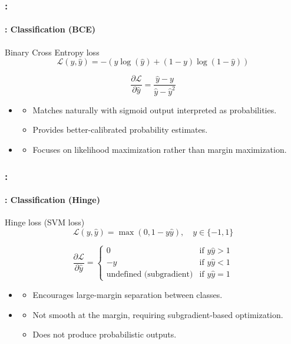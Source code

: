 \documentclass[xcolor=table]{beamer}
\begin{document}
\begin{frame}
	\frametitle{\insertshortsubtitle: \insertsection}
	\framesubtitle{\insertsubsection: Classification (BCE)}

	\begin{block}{Binary Cross Entropy loss}
		\[\mathcal{L}(y, \hat{y}) = - (y \log(\hat{y}) + (1 - y) \log(1 - \hat{y}))\]
		
		\[
		\frac{\partial \mathcal{L}}{\partial \hat{y}} = \frac{\hat{y} - y}{\hat{y} - \hat{y}^2}
		\]
	\end{block}
	
	\begin{itemize}
		\item {}
		\begin{itemize}
			\item Matches naturally with sigmoid output interpreted as probabilities.
			\item Provides better-calibrated probability estimates.
		\end{itemize}
		\item {}
		\begin{itemize}
			\item Focuses on likelihood maximization rather than margin maximization.
		\end{itemize}
	\end{itemize}

\end{frame}

\begin{frame}
	\frametitle{\insertshortsubtitle: \insertsection}
	\framesubtitle{\insertsubsection: Classification (Hinge)}

	\begin{block}{Hinge loss (SVM loss)}
		\[\mathcal{L}(y, \hat{y}) = \max(0, 1 - y \hat{y}), \quad y \in \{-1, 1\}\]
		
		\[
		\frac{\partial \mathcal{L}}{\partial \hat{y}} =
		\begin{cases}
			0 & \text{if } y \hat{y} > 1 \\
			-y & \text{if } y \hat{y} < 1 \\
			\text{undefined (subgradient)} & \text{if } y \hat{y} = 1
		\end{cases}
		\]
	\end{block}
	
	\begin{itemize}
		\item {}
		\begin{itemize}
			\item Encourages large-margin separation between classes.
		\end{itemize}
		\item {}
		\begin{itemize}
			\item Not smooth at the margin, requiring subgradient-based optimization.
			\item Does not produce probabilistic outputs.
		\end{itemize}
	\end{itemize}

\end{frame}
\end{document}
